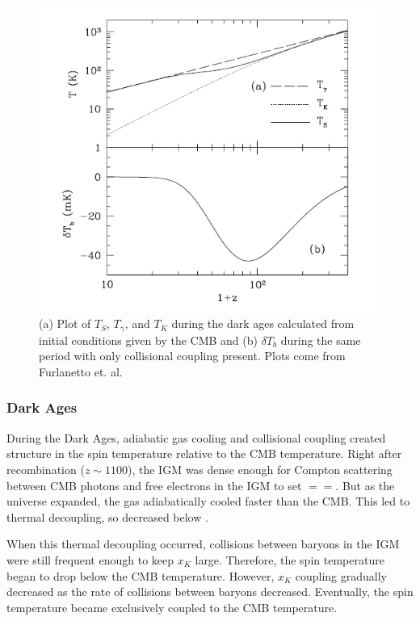 \begin{figure}[htb]
\begin{center}
\includegraphics[width=0.95\linewidth]{Introduction/figures/dark_ages_global_spectrum.jpg}
\caption{(a) Plot of $T_S$, $T_\gamma$, and $T_K$ during the dark ages calculated from initial conditions given by the CMB and (b) $\delta T_b$ during the same period with only collisional coupling present. Plots come from Furlanetto et. al. \cite{furlanetto_2006}}
\label{Fig:da_global}
\end{center}
\end{figure}

\subsubsection{Dark Ages}

During the Dark Ages, adiabatic gas cooling and collisional coupling created structure in the spin temperature relative to the CMB temperature. Right after recombination ($z \sim 1100$), the IGM was dense enough for Compton scattering between CMB photons and free electrons in the IGM to set \tk$=$\tg$=$\ts. But as the universe expanded, the gas adiabatically cooled faster than the CMB. This led to thermal decoupling, so \tk decreased below \tg. 

When this thermal decoupling occurred, collisions between baryons in the IGM were still frequent enough to keep $x_K$ large. Therefore, the spin temperature began to drop below the CMB temperature. However, $x_K$ coupling gradually decreased as the rate of collisions between baryons decreased. Eventually, the spin temperature became exclusively coupled to the CMB temperature. 

